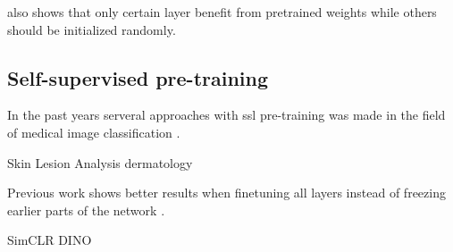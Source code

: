 \autocite{raghu2019} also shows that only certain layer benefit from pretrained weights while others should be initialized randomly.


\subsection{Self-supervised pre-training}
In the past years serveral approaches with \gls{ssl} pre-training was made in the field of medical image classification \autocite{zhou2019,chen2019,taleb2020,bai2019,abbet2020,sowrirajan2020}.

Skin Lesion Analysis
dermatology \autocite{chaves2021}

Previous work shows better results when finetuning all layers instead of freezing earlier parts of the network \autocite{newell2020}.





SimCLR \autocite{chen2020}
DINO \autocite{caron2021}





